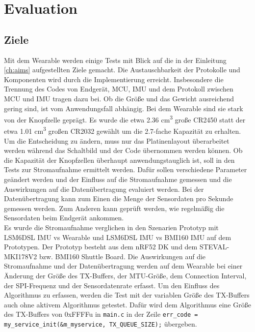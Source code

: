 \chapter{Evaluation}
\label{ch:evaluation}

\section{Ziele}
\label{ch:aimEval}
Mit dem Wearable werden einige Tests mit Blick auf die in der Einleitung \ref{ch:aims} aufgestellten Ziele gemacht.
Die Austauschbarkeit der Protokolle und Komponenten wird durch die Implementierung erreicht.
Insbesondere die Trennung des Codes von Endgerät, MCU, IMU und dem Protokoll zwischen MCU und IMU tragen dazu bei.
Ob die Größe und das Gewicht ausreichend gering sind, ist vom Anwendungsfall abhängig.
Bei dem Wearable sind sie stark von der Knopfzelle geprägt.
Es wurde die etwa 2.36 cm\textsuperscript{3} große CR2450 statt der etwa 1.01 cm\textsuperscript{3} großen CR2032 gewählt um die 2.7-fache Kapazität zu erhalten.
Um die Entscheidung zu ändern, muss nur das Platinenlayout überarbeitet werden während das Schaltbild und der Code übernommen werden können.
Ob die Kapazität der Knopfzellen überhaupt anwendungstauglich ist, soll in den Tests zur Stromaufnahme ermittelt werden.
Dafür sollen verschiedene Parameter geändert werden und der Einfluss auf die Stromaufnahme gemessen und die Auswirkungen auf die Datenübertragung evaluiert werden.
Bei der Datenübertragung kann zum Einen die Menge der Sensordaten pro Sekunde gemessen werden.
Zum Anderen kann geprüft werden, wie regelmäßig die Sensordaten beim Endgerät ankommen.\\
Es wurde die Stromaufnahme verglichen in den Szenarien Prototyp mit LSM6DSL IMU vs Wearable und LSM6DSL IMU vs BMI160 IMU auf dem Prototypen.
Der Prototyp besteht aus dem nRF52 DK und dem STEVAL-MKI178V2 bzw. BMI160 Shuttle Board.
Die Auswirkungen auf die Stromaufnahme und der Datenübertragung werden auf dem Wearable bei einer Änderung der Größe des TX-Buffers, der MTU-Größe, dem Connection Interval, der SPI-Frequenz und der Sensordatenrate erfasst.
Um den Einfluss des Algorithmus zu erfassen, werden die Test mit der variablen Größe des TX-Buffers auch ohne aktivem Algorithmus getestet.
Dafür wird dem Algorithmus eine Größe des TX-Buffers von 0xFFFFu in \texttt{main.c} in der Zeile \texttt{err\_code = my\_service\_init(\allowbreak{}\&m\_myservice, TX\_QUEUE\_SIZE);} übergeben.

